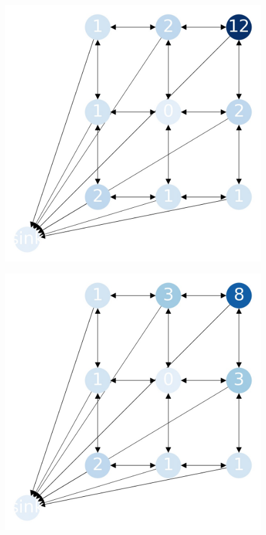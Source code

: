 \documentclass{beamer}
\begin{document}
\begin{frame}
  \begin{figure}[h!]
    \centering
      \includegraphics[scale=0.25]{sandpile_28}
  \end{figure}
\end{frame}


\begin{frame}
  \begin{figure}[h!]
    \centering
      \includegraphics[scale=0.25]{sandpile_29}
  \end{figure}
\end{frame}
\end{document}
